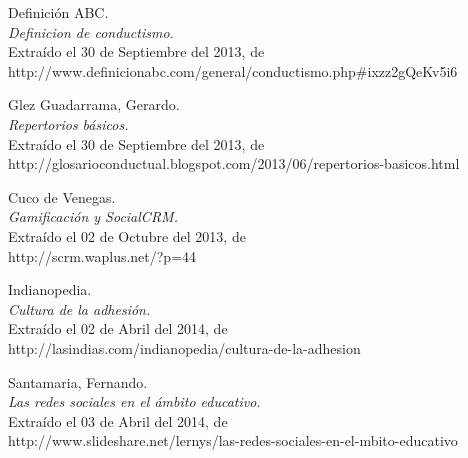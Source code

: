 \begin{thebibliography}{99}
 Definición ABC.\\
\emph{Definicion de conductismo.}\\
Extraído el 30 de Septiembre del 2013, de\\
http://www.definicionabc.com/general/conductismo.php\#ixzz2gQeKv5i6

 Glez Guadarrama, Gerardo.\\
\emph{Repertorios básicos.}\\
Extraído el 30 de Septiembre del 2013, de\\
http://glosarioconductual.blogspot.com/2013/06/repertorios-basicos.html

 Cuco de Venegas.\\
\emph{Gamificación y SocialCRM.}\\
Extraído el 02 de Octubre del 2013, de\\
http://scrm.waplus.net/?p=44

 Indianopedia.\\
\emph{Cultura de la adhesión.}\\
Extraído el 02 de Abril del 2014, de\\
http://lasindias.com/indianopedia/cultura-de-la-adhesion

 Santamaria, Fernando.\\
\emph{Las redes sociales en el ámbito educativo.}\\
Extraído el 03 de Abril del 2014, de\\
http://www.slideshare.net/lernys/las-redes-sociales-en-el-mbito-educativo

\end{thebibliography}
